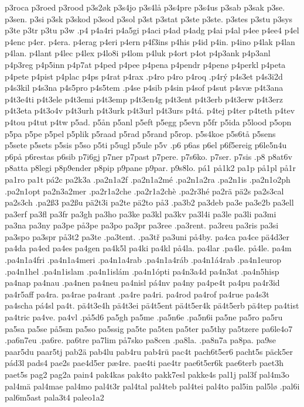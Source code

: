 {{p3roca
p3roed
p3rood
p3s2øk
p3s4jo
p3s4lå
p3s4pre
p3s4us
p3sab
p3sak
p3se.
p3sen.
p3si
p3sk
p3skod
p3sod
p3sol
p3st
p3stat
p3ste
p3ste.
p3stes
p3stu
p3sys
p3te
p3tr
p3tu
p3w
.p4
p4a4ri
p4a5gi
p4aci
p4ad
p4adg
p4ai
p4al
p4ee
p4ee4
p4el
p4enc
p4er.
p4era.
p4erag
p4eri
p4ern
p4f3ins
p4his
p4id
p4in.
p4ino
p4lak
p4lan
p4lan.
p4lant
p4lec
p4lex
p4lo8i
p4lom
p4luk
p4ort
p4ot
p4p3ank
p4p3anl
p4p3reg
p4p5inn
p4p7at
p4ped
p4pee
p4pena
p4pendr
p4penø
p4perkl
p4peta
p4pete
p4pist
p4plac
p4ps
p4rat
p4rax
.p4ro
p4ro
p4roq
.p4rý
p4s3et
p4s3i2d
p4s3kil
p4s3na
p4s5pro
p4s5tem
.p4se
p4sib
p4sin
p4sof
p4sut
p4svæ
p4t3ana
p4t3e4ti
p4t3ele
p4t3emi
p4t3emp
p4t3en4g
p4t3ent
p4t3erb
p4t3erw
p4t3erz
p4t3eta
p4t3o4v
p4t3urh
p4t3urk
p4t3url
p4t3urs
p4tá.
p4tej
p4ter
p4teth
p4tev
p4tou
p4tut
p4tw
p5ad.
p5ån
p5anl
p5eft
p5egg
p5evn
p5fr
p5ida
p5lood
p5opn
p5pa
p5pe
p5pel
p5plik
p5raad
p5rad
p5rand
p5rop.
p5s4koe
p5s6tå
p5sens
p5sete
p5sets
p5sis
p5so
p5ti
p5ugl
p5ule
p5v
.p6
p6as
p6el
p6f5ereig
p6le5n4u
p6på
p6restas
p6sib
p7i6gj
p7ner
p7past
p7pere.
p7s6ko.
p7ser.
p7sis
.p8
p8at6v
p8atta
p8legi
p8p9ender
p8pip
p9pane
p9par.
p9s8lo.
pá1
på1k2
pa1p
på1pl
på1r
pa1ro
pa1t
pá2c
pa2k3a
.pa2n1a2f
.pa2n1a2mé
.pa2n1a2ra
.pa2n1is
.pa2n1o2ph
.pa2n1opt
pa2n3a2mer
.pa2r1a2che
.pa2r1a2chè
.pa2r3hé
pa2rä
pä2s
pa2s3cal
pa2s3ch
.pa2ß3
pa2ßu
pä2t3i
pa2te
pä2to
på3
.pa3b2
pa3deb
pa3e
pa3e2b
pa3ell
pa3erf
pa3fl
pa3fr
pa3gh
pa3ho
pa3ke
pa3kl
pa3kv
pa3l4i
pa3le
pa3li
pa3mi
pa3na
pa3ny
pa3pe
på3pe
pa3po
pa3pr
pa3ree
.pa3rent.
pa3reu
pa3ris
pa3si
pa3spo
pa3spr
på3t2
pa3te
.pa3tent.
.pa3tř
pa3uni
på4by.
pa4ca
pa4ce
pä4d3er
pa4da
pa4ed
pa4es
pa4gen
pa4k5l
pa4ki
pa4kl
på4la.
pa4lar
.pa4le.
på4le.
pa4m
.pa4n1a4fri
.pa4n1a4meri
.pa4n1a4rab
.pa4n1a4ráb
.pa4n1á4rab
.pa4n1europ
.pa4n1hel
.pa4n1islam
.pa4n1islám
.pa4n1ópti
pa4n3a4d
pa4n3at
.pa4n5hisp
pa4nap
pa4nau
.pa4nen
pa4neu
pa4nisl
pá4nv
pa4ny
pa4pe4t
pa4pu
pa4r3id
pa4r5aff
pa4ra.
pa4rae
pa4rant
.pa4re
pa4ri.
pa4rod
pa4rof
pa4rue
pa4s3t
pa4scha
pá4sl
pa4t.
pä4t3e4h
pä4t3ei
pä4t5ent
pä4t5er4k
pä4t5erb
pä4tep
pa4tist
pa4tric
pa4ve.
pa4vl
.på5d6
pa5gh
pa5me
.pa5n6e
.pa5n6i
pa5ne
pa5ro
pa5ru
pa5sa
pa5se
på5sm
pa5so
pa5ssig
pa5te
pa5ten
pa5ter
pa5thy
pa5tzere
pa6le4o7
.pa6n7eu
.pa6re.
pa6tre
pa7lim
på7sko
pa8cen
.pa8la.
.pa8n7a
pa8pa.
pa9se
paar5du
paar5tj
pab2ä
pab4lu
pab4ru
pab4rü
pac4t
pach6t5er6
pacht5s
päck5er
pád3l
pads4
pae2s
pae4d5er
pæ4re.
pae4ti
pae4tr
pae6t5er6k
pae6terb
paet3h
paet5s
pag2
pag2a
pain4
pak4kas
pak4to
pakk7esl
pakke4s
pal1j
pal3f
pal4m3o
pal4mä
pal4mae
pal4mo
pal4t3r
pal4tal
pal4teb
pal4tei
pal4to
pal5in
pal5lø
.pal6i
pal6m5ast
pala3t4
paleo1a2
}}
